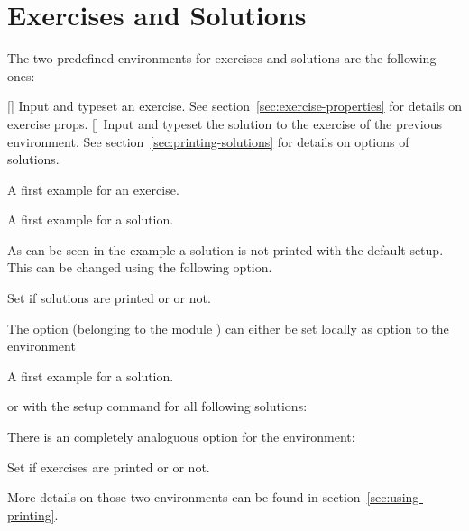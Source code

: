 \documentclass{xsim-manual}
\begin{document}
\section{Exercises and Solutions}

The two predefined environments for exercises and solutions are the following
ones:
\begin{environments}
  []
    Input and typeset an exercise.  See section~\vref{sec:exercise-properties}
    for details on exercise \acsp*{prop}.
  []
    Input and typeset the solution to the exercise of the previous
     environment.  See section~\vref{sec:printing-solutions} for
    details on options of solutions.
\end{environments}

\begin{example}
  \begin{exercise}
    A first example for an exercise.
  \end{exercise}
  \begin{solution}
    A first example for a solution.
  \end{solution}
\end{example}

As can be seen in the example a solution is not printed with the default
setup.  This can be changed using the following option.
\begin{options}
    Set if solutions are printed or or not.
\end{options}

The option (belonging to the module ) can either be set
locally as option to the  environment
\begin{sourcecode}
  \begin{solution}[print=true]
    A first example for a solution.
  \end{solution}
\end{sourcecode}
or with the setup command for all following solutions:
\begin{sourcecode}
\end{sourcecode}

There is an completely analoguous option for the  environment:
\begin{options}
    Set if exercises are printed or or not.
\end{options}
More details on those two environments can be found in
section~\vref{sec:using-printing}.
\end{document}
